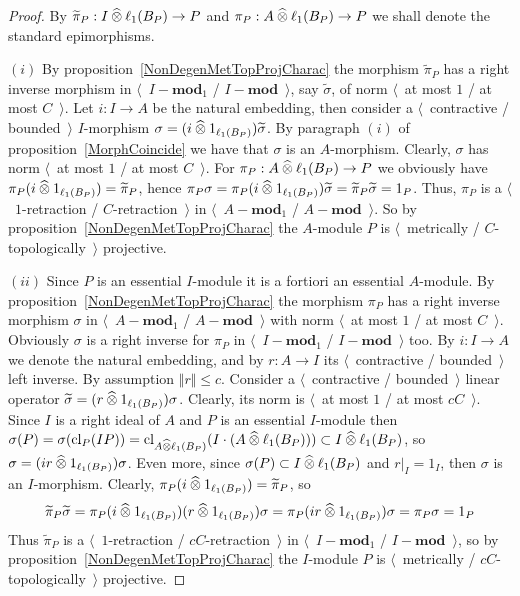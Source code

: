 \begin{proof} By $\widetilde{\pi}_P: I\mathbin{\widehat{\otimes}} \ell_1(B_P)\to P$ and
$\pi_P:A\mathbin{\widehat{\otimes}} \ell_1(B_P)\to P$ we shall denote the standard epimorphisms.

$(i)$ By proposition~\ref{NonDegenMetTopProjCharac} the morphism
$\widetilde{\pi}_P$ has a right inverse morphism in $\langle$~$I-\mathbf{mod}_1$
/ $I-\mathbf{mod}$~$\rangle$, say $\widetilde{\sigma}$, of norm $\langle$~at most
$1$ / at most $C$~$\rangle$. Let $i:I\to A$ be the natural embedding, then
consider a $\langle$~contractive / bounded~$\rangle$ $I$-morphism
$\sigma=(i\mathbin{\widehat{\otimes}} 1_{\ell_1(B_P)})\widetilde{\sigma}$. By paragraph $(i)$ of
proposition~\ref{MorphCoincide} we have that $\sigma$ is an $A$-morphism.
Clearly, $\sigma$ has norm $\langle$~at most $1$ / at most $C$~$\rangle$. For
$\pi_P:A\mathbin{\widehat{\otimes}} \ell_1(B_P)\to P$ we obviously 
have $\pi_P(i\mathbin{\widehat{\otimes}} 1_{\ell_1(B_P)})=\widetilde{\pi}_P$, 
hence 
$\pi_P\sigma
=\pi_P(i\mathbin{\widehat{\otimes}} 1_{\ell_1(B_P)})\widetilde{\sigma}
=\widetilde{\pi}_P\widetilde{\sigma}
=1_P$.
Thus, $\pi_P$ is a $\langle$~$1$-retraction / $C$-retraction~$\rangle$ in
$\langle$~$A-\mathbf{mod}_1$ / $A-\mathbf{mod}$~$\rangle$. So by
proposition~\ref{NonDegenMetTopProjCharac} the $A$-module $P$ is
$\langle$~metrically / $C$-topologically~$\rangle$ projective.

$(ii)$ Since $P$ is an essential $I$-module it is a fortiori an essential
$A$-module. By proposition~\ref{NonDegenMetTopProjCharac} the morphism $\pi_P$
has a right inverse morphism $\sigma$ in $\langle$~$A-\mathbf{mod}_1$ /
$A-\mathbf{mod}$~$\rangle$ with norm $\langle$~at most $1$ / at most
$C$~$\rangle$. Obviously $\sigma$ is a right inverse for $\pi_P$ in
$\langle$~$I-\mathbf{mod}_1$ / $I-\mathbf{mod}$~$\rangle$ too. By $i:I\to A$ we
denote the natural embedding, and by $r:A\to I$ its $\langle$~contractive /
bounded~$\rangle$ left inverse. By assumption $\Vert r\Vert\leq c$. Consider a
$\langle$~contractive / bounded~$\rangle$ linear operator
$\widetilde{\sigma}=(r\mathbin{\widehat{\otimes}} 1_{\ell_1(B_P)})\sigma$. Clearly, its norm is
$\langle$~at most $1$ / at most $cC$~$\rangle$. Since $I$ is a right ideal of
$A$ and $P$ is an essential $I$-module then
$\sigma(P)
=\sigma(\operatorname{cl}_P(IP))
=\operatorname{cl}_{A\mathbin{\widehat{\otimes}} \ell_1(B_P)}(I\cdot (A\mathbin{\widehat{\otimes}} \ell_1(B_P)))
\subset I\mathbin{\widehat{\otimes}} \ell_1(B_P)$, so
$\sigma=(ir\mathbin{\widehat{\otimes}} 1_{\ell_1(B_P)})\sigma$. Even more, 
since $\sigma(P)\subset I\mathbin{\widehat{\otimes}}\ell_1(B_P)$ and $r|_I=1_I$, 
then $\sigma$ is an $I$-morphism.
Clearly, $\pi_P(i\mathbin{\widehat{\otimes}} 1_{\ell_1(B_P)})=\widetilde{\pi}_P$, so
$$
\widetilde{\pi}_P\widetilde{\sigma}
=\pi_P(i\mathbin{\widehat{\otimes}} 1_{\ell_1(B_P)})(r \mathbin{\widehat{\otimes}} 1_{\ell_1(B_P)})\sigma
=\pi_P(ir\mathbin{\widehat{\otimes}} 1_{\ell_1(B_P)})\sigma
=\pi_P\sigma
=1_P
$$ 
Thus $\widetilde{\pi}_P$ is 
a $\langle$~$1$-retraction / $cC$-retraction~$\rangle$ 
in $\langle$~$I-\mathbf{mod}_1$ / $I-\mathbf{mod}$~$\rangle$, so by
proposition~\ref{NonDegenMetTopProjCharac} the $I$-module $P$ is
$\langle$~metrically / $cC$-topologically~$\rangle$ projective.
\end{proof}

